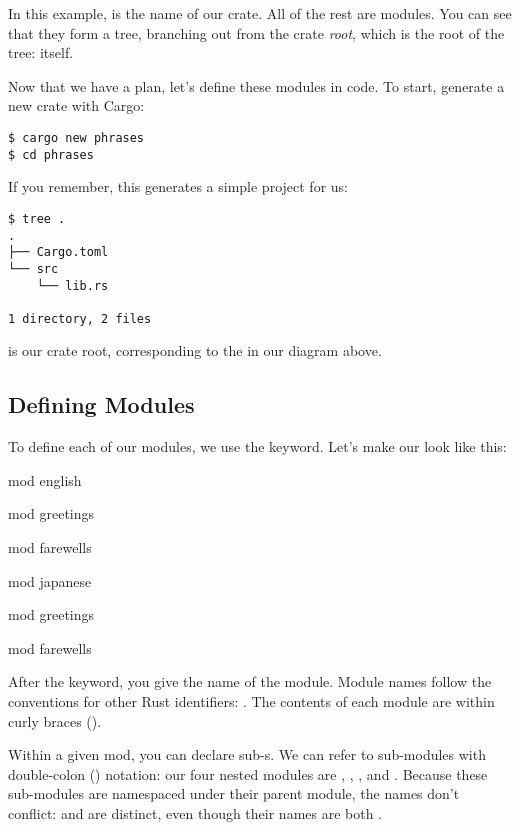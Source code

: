 In this example,  is the name of our crate. All of the rest are modules. You can see that they form a tree, branching out 
from the crate \emph{root}, which is the root of the tree:  itself.

\blank

Now that we have a plan, let's define these modules in code. To start, generate a new crate with Cargo:

\begin{verbatim}
$ cargo new phrases
$ cd phrases
\end{verbatim}

If you remember, this generates a simple project for us:

\begin{verbatim}
$ tree .
.
├── Cargo.toml
└── src
    └── lib.rs

1 directory, 2 files
\end{verbatim}

 is our crate root, corresponding to the  in our diagram above.

\subsection*{Defining Modules}

To define each of our modules, we use the  keyword. Let's make our  look like this:

\begin{rustc}
mod english {
    mod greetings {
    }

    mod farewells {
    }
}

mod japanese {
    mod greetings {
    }

    mod farewells {
    }
}
\end{rustc}

After the  keyword, you give the name of the module. Module names follow the conventions for other Rust identifiers: 
. The contents of each module are within curly braces (\code{\{\}}).

\blank

Within a given mod, you can declare sub-s. We can refer to sub-modules with double-colon (\code{::}) notation: our four 
nested modules are , , , and . 
Because these sub-modules are namespaced under their parent module, the names don't conflict:  and 
 are distinct, even though their names are both .

